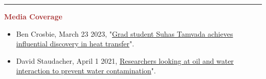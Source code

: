 \documentclass[11pt, letterpaper]{article}
\renewcommand{\headrulewidth}{0pt}
\renewcommand{\footrulewidth}{0pt}
\begin{document}
\vspace{-10pt}
\noindent \rule[2pt]{\textwidth}{0.5pt}
\noindent \textbf{\large \textcolor{Brown}{Media Coverage}}\\
\begin{itemize}[leftmargin=*]
\setlength\itemsep{-1pt}
\vspace{-8pt}
\item Ben Crosbie, March 23 2023, "\href{https://mae.ufl.edu/2023/03/23/grad-student-suhas-tamvada-achieves-influential-discovery-in-heat-transfer/}{Grad student Suhas Tamvada achieves influential discovery in heat transfer}".
\item David Staudacher, April 1 2021, \href{https://mie.uic.edu/news-stories/researchers-looking-at-oil-and-water-interaction-to-prevent-water-contamination/}{Researchers looking at oil and water interaction to prevent water contamination}".
\end{itemize}
\thispagestyle{fancy}
\setlength{\voffset}{0in}
\setlength{\headsep}{6pt}
\setlength{\headheight}{50pt}
\footskip 1pt
\renewcommand{\headrulewidth}{0.5pt}
\renewcommand{\footrulewidth}{0pt}
\end{document}
